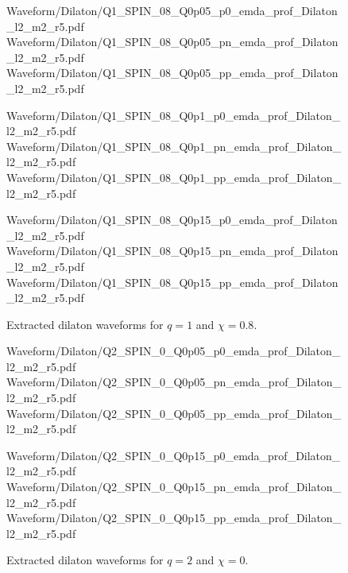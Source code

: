 \begin{figure}[p]
\centering

{Waveform/Dilaton/Q1_SPIN_08_Q0p05_p0_emda_prof_Dilaton_l2_m2_r5.pdf}
\hfill
{}
{Waveform/Dilaton/Q1_SPIN_08_Q0p05_pn_emda_prof_Dilaton_l2_m2_r5.pdf}
\hfill
{}
{Waveform/Dilaton/Q1_SPIN_08_Q0p05_pp_emda_prof_Dilaton_l2_m2_r5.pdf}

\vspace{0.6em}

{Waveform/Dilaton/Q1_SPIN_08_Q0p1_p0_emda_prof_Dilaton_l2_m2_r5.pdf}
\hfill
{}
{Waveform/Dilaton/Q1_SPIN_08_Q0p1_pn_emda_prof_Dilaton_l2_m2_r5.pdf}
\hfill
{}
{Waveform/Dilaton/Q1_SPIN_08_Q0p1_pp_emda_prof_Dilaton_l2_m2_r5.pdf}

\vspace{0.6em}

{Waveform/Dilaton/Q1_SPIN_08_Q0p15_p0_emda_prof_Dilaton_l2_m2_r5.pdf}
\hfill
{}
{Waveform/Dilaton/Q1_SPIN_08_Q0p15_pn_emda_prof_Dilaton_l2_m2_r5.pdf}
\hfill
{}
{Waveform/Dilaton/Q1_SPIN_08_Q0p15_pp_emda_prof_Dilaton_l2_m2_r5.pdf}

\caption{Extracted dilaton waveforms for $q=1$ and $\chi=0.8$.}
\label{fig:dilaton_catalog_q1_chi08}
\end{figure}
\begin{figure}[p]
\centering

{Waveform/Dilaton/Q2_SPIN_0_Q0p05_p0_emda_prof_Dilaton_l2_m2_r5.pdf}
\hfill
{}
{Waveform/Dilaton/Q2_SPIN_0_Q0p05_pn_emda_prof_Dilaton_l2_m2_r5.pdf}
\hfill
{}
{Waveform/Dilaton/Q2_SPIN_0_Q0p05_pp_emda_prof_Dilaton_l2_m2_r5.pdf}

\vspace{0.6em}

{Waveform/Dilaton/Q2_SPIN_0_Q0p15_p0_emda_prof_Dilaton_l2_m2_r5.pdf}
\hfill
{}
{Waveform/Dilaton/Q2_SPIN_0_Q0p15_pn_emda_prof_Dilaton_l2_m2_r5.pdf}
\hfill
{}
{Waveform/Dilaton/Q2_SPIN_0_Q0p15_pp_emda_prof_Dilaton_l2_m2_r5.pdf}

\caption{Extracted dilaton waveforms for $q=2$ and $\chi=0$.}
\label{fig:dilaton_catalog_q2_chi0}
\end{figure}

